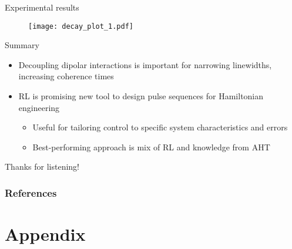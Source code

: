 \documentclass{beamer}
\begin{document}
\begin{frame}{Experimental results}

\begin{figure}
\centering
\texttt{[image: decay\_plot\_1.pdf]}
\end{figure}

\end{frame}

\begin{frame}{Summary}

\begin{itemize}
    \item Decoupling dipolar interactions is important for narrowing linewidths, increasing coherence times
    \item RL is promising new tool to design pulse sequences for Hamiltonian engineering
    \begin{itemize}
        \item Useful for tailoring control to specific system characteristics and errors
        \item Best-performing approach is mix of RL and knowledge from AHT
    \end{itemize}
\end{itemize}

\pause

\begin{center}
    Thanks for listening!
\end{center}

\end{frame}

\begin{frame}[allowframebreaks]
\frametitle{References}

\printbibliography

\end{frame}
















\section{Appendix}
\end{document}
